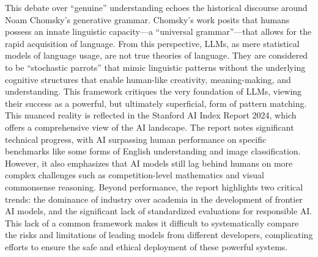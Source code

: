 \documentclass[12pt]{article}
\begin{document}
This debate over ``genuine'' understanding echoes the historical discourse around Noam Chomsky's generative grammar. Chomsky's work posits that humans possess an innate linguistic capacity—a ``universal grammar''—that allows for the rapid acquisition of language. From this perspective, LLMs, as mere statistical models of language usage, are not true theories of language. They are considered to be ``stochastic parrots'' that mimic linguistic patterns without the underlying cognitive structures that enable human-like creativity, meaning-making, and understanding. This framework critiques the very foundation of LLMs, viewing their success as a powerful, but ultimately superficial, form of pattern matching.\cite{inproceedings}\cite{Chomsky}\\
This nuanced reality is reflected in the Stanford AI Index Report 2024, which offers a comprehensive view of the AI landscape. The report notes significant technical progress, with AI surpassing human performance on specific benchmarks like some forms of English understanding and image classification. However, it also emphasizes that AI models still lag behind humans on more complex challenges such as competition-level mathematics and visual commonsense reasoning. Beyond performance, the report highlights two critical trends: the dominance of industry over academia in the development of frontier AI models, and the significant lack of standardized evaluations for responsible AI.\cite{aiindex} This lack of a common framework makes it difficult to systematically compare the risks and limitations of leading models from different developers, complicating efforts to ensure the safe and ethical deployment of these powerful systems.\cite{ethicalAi}
\end{document}
